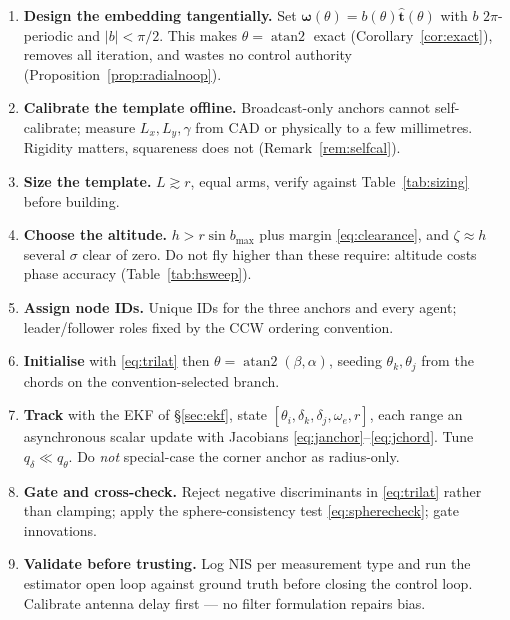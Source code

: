 \documentclass[11pt,a4paper]{article}
\newcommand{\that}{\hat{\bm{t}}}
\begin{document}
\begin{enumerate}
  \item \textbf{Design the embedding tangentially.} Set
        $\bm\omega(\theta) = b(\theta)\that(\theta)$ with $b$ $2\pi$-periodic
        and $|b| < \pi/2$. This makes $\theta=\operatorname{atan2}$ exact
        (Corollary~\ref{cor:exact}), removes all iteration, and wastes no
        control authority (Proposition~\ref{prop:radialnoop}).
  \item \textbf{Calibrate the template offline.} Broadcast-only anchors cannot
        self-calibrate; measure $L_x, L_y, \gamma$ from CAD or physically to a
        few millimetres. Rigidity matters, squareness does not
        (Remark~\ref{rem:selfcal}).
  \item \textbf{Size the template.} $L \gtrsim r$, equal arms, verify against
        Table~\ref{tab:sizing} before building.
  \item \textbf{Choose the altitude.} $h > r\sin b_{\max}$ plus margin
        \eqref{eq:clearance}, and $\zeta \approx h$ several $\sigma$ clear of
        zero. Do not fly higher than these require: altitude costs phase
        accuracy (Table~\ref{tab:hsweep}).
  \item \textbf{Assign node IDs.} Unique IDs for the three anchors and every
        agent; leader/follower roles fixed by the CCW ordering convention.
  \item \textbf{Initialise} with \eqref{eq:trilat} then
        $\theta=\operatorname{atan2}(\beta,\alpha)$, seeding $\theta_k,\theta_j$
        from the chords on the convention-selected branch.
  \item \textbf{Track} with the EKF of \S\ref{sec:ekf}, state
        $[\theta_i,\delta_k,\delta_j,\omega_e,r]$, each range an asynchronous
        scalar update with Jacobians \eqref{eq:janchor}--\eqref{eq:jchord}.
        Tune $q_\delta \ll q_\theta$. Do \emph{not} special-case the corner
        anchor as radius-only.
  \item \textbf{Gate and cross-check.} Reject negative discriminants in
        \eqref{eq:trilat} rather than clamping; apply the sphere-consistency
        test \eqref{eq:spherecheck}; gate innovations.
  \item \textbf{Validate before trusting.} Log NIS per measurement type and run
        the estimator open loop against ground truth before closing the control
        loop. Calibrate antenna delay first --- no filter formulation repairs
        bias.
\end{enumerate}
\end{document}
